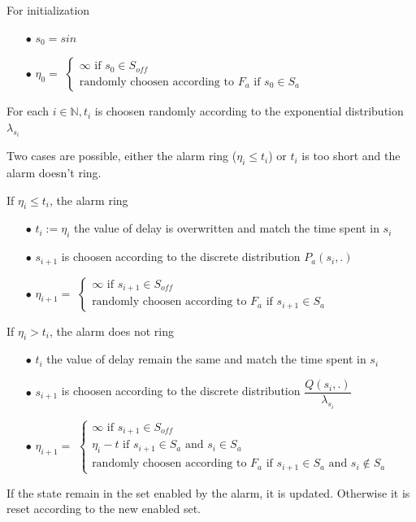 \documentclass[runningheads,custombib]{llncs}
\begin{document}
For initialization
\begin{itemize}
	\item[$\bullet$] $s_0 = s{in}$
	\item[$\bullet$] $\eta_0 =$
	$\left\{
		\begin{array}{l}
		\infty \text{ if } s_0 \in S_{off}\\
		 \text{randomly choosen according to }F_a\text{ if } s_0 \in S_{a}
		\end{array}
		\right.$ 
\end{itemize}
For each $i \in \mathbb{N}, t_i$ is choosen randomly according to the exponential distribution $\lambda_{s_i}$

Two cases are possible, either the alarm ring ($\eta_i \leq t_i$) or $t_i$ is too short and the alarm doesn't ring.

If $\eta_i \leq t_i$, the alarm ring
\begin{itemize}
	\item[$\bullet$] $t_i := \eta_i$ the value of delay is overwritten and match the time spent in $s_i$
	\item[$\bullet$] $s_{i+1}$ is choosen according to the discrete distribution $P_a(s_i,.)$
	\item[$\bullet$] $\eta_{i+1} =$
	$\left\{
	\begin{array}{l}
		\infty \text{ if } s_{i+1} \in S_{off}\\
		\text{randomly choosen according to }F_a\text{ if } s_{i+1} \in S_{a}
	\end{array}
	\right.$ 
\end{itemize}

If $\eta_i > t_i$, the alarm does not ring
\begin{itemize}
	\item[$\bullet$] $t_i$ the value of delay remain the same and match the time spent in $s_i$
\item[$\bullet$] $s_{i+1}$ is choosen according to the discrete distribution $\dfrac{Q(s_i,.)}{\lambda_{s_i}}$
	\item[$\bullet$] $\eta_{i+1} =$
	$\left\{
	\begin{array}{l}
	\infty \text{ if } s_{i+1} \in S_{off}\\
	\eta_i - t\text{ if }s_{i+1} \in S_{a}\text{ and }s_{i} \in S_{a}\\
	\text{randomly choosen according to }F_a\text{ if }s_{i+1} \in S_{a}\text{ and }s_{i} \notin S_{a}
	\end{array}
	\right.$ 
\end{itemize}
 If the state remain in the set enabled by the alarm, it is updated. Otherwise it is reset according to the new enabled set.
 
\end{document}
